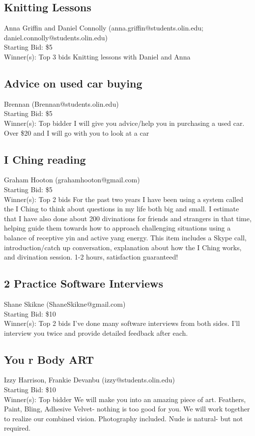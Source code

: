 \documentclass[11pt]{article}
\begin{document}
\subsection{Knitting Lessons}
Anna Griffin and Daniel Connolly (anna.griffin@students.olin.edu; daniel.connolly@students.olin.edu) \\
Starting Bid: \$5 \\
Winner(s): 
Top 3 bids\newline
Knitting lessons with Daniel and Anna
\subsection{Advice on used car buying}
Brennan (Brennan@students.olin.edu) \\
Starting Bid: \$5 \\
Winner(s): 
Top bidder\newline
I will give you advice/help you in purchasing a used car. Over \$20 and I will go with you to look at a car
\subsection{I Ching reading}
Graham Hooton (grahamhooton@gmail.com) \\
Starting Bid: \$5 \\
Winner(s): 
Top 2 bids\newline
For the past two years I have been using a system called the I Ching to think about questions in my life both big and small. I estimate that I have also done about 200 divinations for friends and strangers in that time, helping guide them towards how to approach challenging situations using a balance of receptive yin and active yang energy.
This item includes a Skype call, introduction/catch up conversation, explanation about how the I Ching works, and divination session. 1-2 hours, satisfaction guaranteed!
\subsection{2 Practice Software Interviews}
Shane Skikne (ShaneSkikne@gmail.com) \\
Starting Bid: \$10 \\
Winner(s): 
Top 2 bids\newline
I've done many software interviews from both sides. I'll interview you twice and provide detailed feedback after each.
\subsection{You r Body ART}
Izzy Harrison, Frankie Devanbu (izzy@students.olin.edu) \\
Starting Bid: \$10 \\
Winner(s): 
Top bidder\newline
We will make you into an amazing piece of art. Feathers, Paint, Bling, Adhesive Velvet- nothing is too good for you. We will work together to realize our combined vision. Photography included. Nude is natural- but not required.
\end{document}
